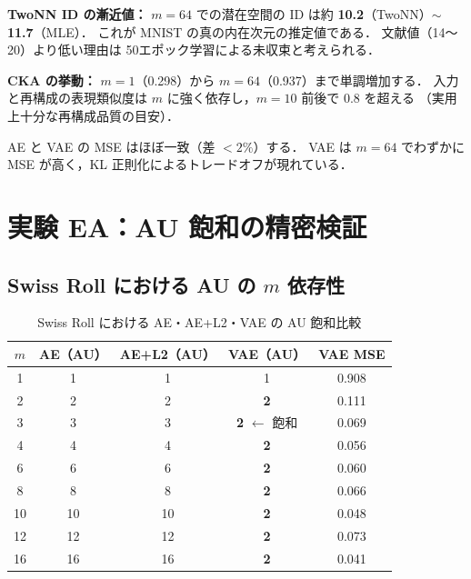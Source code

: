 \documentclass[12pt,a4paper]{ltjsarticle}  %
\begin{document}
\textbf{TwoNN ID の漸近値：}
$m = 64$ での潜在空間の ID は約 \textbf{10.2}（TwoNN）$\sim$ \textbf{11.7}（MLE）．
これが MNIST の真の内在次元の推定値である．
文献値（14〜20）より低い理由は 50エポック学習による未収束と考えられる．

\textbf{CKA の挙動：}
$m = 1$（0.298）から $m = 64$（0.937）まで単調増加する．
入力と再構成の表現類似度は $m$ に強く依存し，$m = 10$ 前後で 0.8 を超える
（実用上十分な再構成品質の目安）．

AE と VAE の MSE はほぼ一致（差 $< 2\%$）する．
VAE は $m = 64$ でわずかに MSE が高く，KL 正則化によるトレードオフが現れている．

\section{実験 EA：AU 飽和の精密検証}
\label{sec:ea}

\subsection{Swiss Roll における AU の $m$ 依存性}

\begin{table}[H]
  \centering
  \caption{Swiss Roll における AE・AE+L2・VAE の AU 飽和比較}
  \label{tab:ea_swiss}
  \renewcommand{\arraystretch}{1.2}
  \begin{tabular}{ccccc}
    \toprule
    $m$ & AE（AU）& AE+L2（AU）& VAE（AU）& VAE MSE \\
    \midrule
    1  & 1  & 1  & 1          & 0.908 \\
    2  & 2  & 2  & \textbf{2} & 0.111 \\
    3  & 3  & 3  & \textbf{2} $\leftarrow$ 飽和 & 0.069 \\
    4  & 4  & 4  & \textbf{2} & 0.056 \\
    6  & 6  & 6  & \textbf{2} & 0.060 \\
    8  & 8  & 8  & \textbf{2} & 0.066 \\
    10 & 10 & 10 & \textbf{2} & 0.048 \\
    12 & 12 & 12 & \textbf{2} & 0.073 \\
    16 & 16 & 16 & \textbf{2} & 0.041 \\
    \bottomrule
  \end{tabular}
\end{table}
\end{document}
